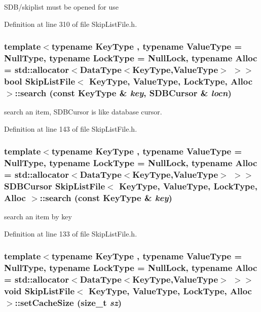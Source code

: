 SDB/skiplist must be opened for use 

Definition at line 310 of file SkipListFile.h.\hypertarget{classSkipListFile_81d3a3d64e98032992514e3dff8b394d}{
\subsubsection[{search}]{\setlength{\rightskip}{0pt plus 5cm}template$<$typename KeyType , typename ValueType  = NullType, typename LockType  = NullLock, typename Alloc  = std::allocator$<$DataType$<$KeyType,ValueType$>$ $>$$>$ bool {\bf SkipListFile}$<$ KeyType, ValueType, LockType, Alloc $>$::search (const KeyType \& {\em key}, \/  {\bf SDBCursor} \& {\em locn})}}
\label{classSkipListFile_81d3a3d64e98032992514e3dff8b394d}


search an item, SDBCursor is like database cursor. 

Definition at line 143 of file SkipListFile.h.\hypertarget{classSkipListFile_b125e379a9640879f05386bb17ede4e2}{
\subsubsection[{search}]{\setlength{\rightskip}{0pt plus 5cm}template$<$typename KeyType , typename ValueType  = NullType, typename LockType  = NullLock, typename Alloc  = std::allocator$<$DataType$<$KeyType,ValueType$>$ $>$$>$ {\bf SDBCursor} {\bf SkipListFile}$<$ KeyType, ValueType, LockType, Alloc $>$::search (const KeyType \& {\em key})}}
\label{classSkipListFile_b125e379a9640879f05386bb17ede4e2}


search an item by key 

Definition at line 133 of file SkipListFile.h.\hypertarget{classSkipListFile_33f3d7ea02a004d7fdedffe582f2ea72}{
\subsubsection[{setCacheSize}]{\setlength{\rightskip}{0pt plus 5cm}template$<$typename KeyType , typename ValueType  = NullType, typename LockType  = NullLock, typename Alloc  = std::allocator$<$DataType$<$KeyType,ValueType$>$ $>$$>$ void {\bf SkipListFile}$<$ KeyType, ValueType, LockType, Alloc $>$::setCacheSize (size\_\-t {\em sz})}}
\label{classSkipListFile_33f3d7ea02a004d7fdedffe582f2ea72}


